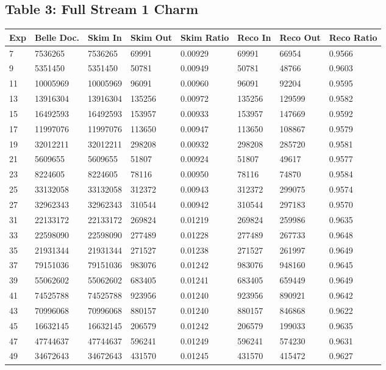 \documentclass[11pt]{article}
\begin{document}
\subsection{Table 3: Full Stream 1 Charm}
\begin{tabular}{ | l || l | l | l | l || l | l | l |}
  \hline
  Exp&Belle Doc. &Skim In &Skim Out&Skim Ratio&Reco In&Reco Out&Reco Ratio\\
  \hline \hline
  7&7536265&7536265&69991&0.00929&69991&66954&0.9566\\ \hline
  9&5351450&5351450&50781&0.00949&50781&48766&0.9603\\\hline
  11&10005969&10005969&96091&0.00960&96091&92204&0.9595\\\hline
  13&13916304&13916304&135256&0.00972&135256&129599&0.9582\\\hline
  15&16492593&16492593&153957&0.00933&153957&147669&0.9592\\\hline
  17&11997076&11997076&113650&0.00947&113650&108867&0.9579\\\hline
  19&32012211&32012211&298208&0.00932&298208&285720&0.9581\\\hline
  21&5609655&5609655&51807&0.00924&51807&49617&0.9577\\\hline
  23&8224605&8224605&78116&0.00950&78116&74870&0.9584\\\hline
  25&33132058&33132058&312372&0.00943&312372&299075&0.9574\\\hline
  27&32962343&32962343&310544&0.00942&310544&297183&0.9570\\\hline
  \hline
  31&22133172&22133172&269824&0.01219&269824&259986&0.9635\\\hline
  33&22598090&22598090&277489&0.01228&277489&267733&0.9648\\\hline
  35&21931344&21931344&271527&0.01238&271527&261997&0.9649\\\hline
  37&79151036&79151036&983076&0.01242&983076&948160&0.9645\\\hline
  39&55062602&55062602&683405&0.01241&683405&659449&0.9649\\\hline
  41&74525788&74525788&923956&0.01240&923956&890921&0.9642\\\hline
  43&70996068&70996068&880157&0.01240&880157&846868&0.9622\\\hline
  45&16632145&16632145&206579&0.01242&206579&199033&0.9635\\\hline
  47&47744637&47744637&596241&0.01249&596241&574230&0.9631\\\hline
  49&34672643&34672643&431570&0.01245&431570&415472&0.9627\\\hline

\end{tabular}
\end{document}
